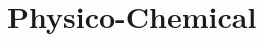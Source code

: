 \hypertarget{group___physico_chemical}{}\section{Physico-\/\+Chemical}
\label{group___physico_chemical}
